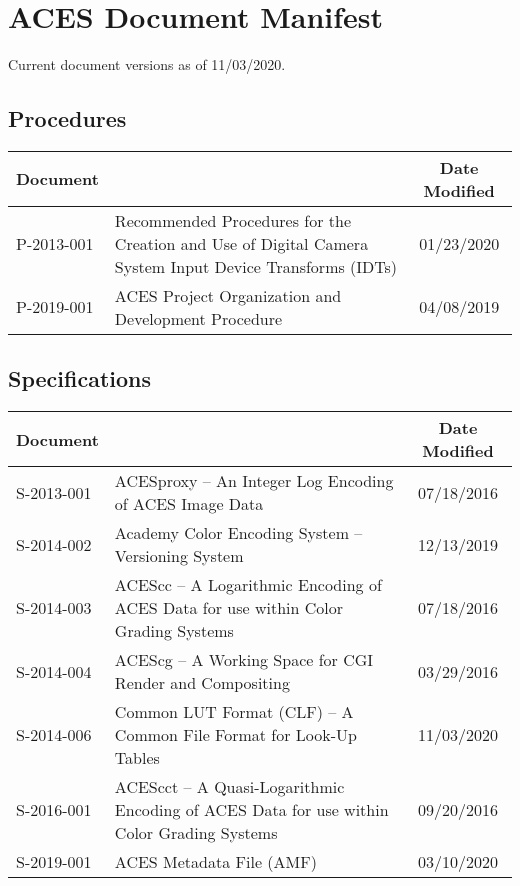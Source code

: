 \documentclass[10pt]{academydoc}
\begin{document}
\regularsectionformat

\section*{ACES Document Manifest}
Current document versions as of 11/03/2020.

\subsection*{Procedures}
\begin{tabularx}{\linewidth}{|l X|c|}
\hline
\textbf{Document} & & \textbf{Date Modified} \\ \hline
P-2013-001 & Recommended Procedures for the Creation and Use of Digital Camera System Input Device Transforms (IDTs) & 01/23/2020 \\ \hline
P-2019-001 & ACES Project Organization and Development Procedure & 04/08/2019 \\ \hline
\end{tabularx}

\subsection*{Specifications}
\begin{tabularx}{\linewidth}{|l X|c|}
\hline
\textbf{Document} & & \textbf{Date Modified} \\ \hline
S-2013-001 & ACESproxy -- An Integer Log Encoding of ACES Image Data & 07/18/2016 \\ \hline
S-2014-002 & Academy Color Encoding System -- Versioning System & 12/13/2019 \\ \hline
S-2014-003 & ACEScc -- A Logarithmic Encoding of ACES Data for use within Color Grading Systems & 07/18/2016 \\ \hline
S-2014-004 & ACEScg -- A Working Space for CGI Render and Compositing & 03/29/2016 \\ \hline
S-2014-006 & Common LUT Format (CLF) -- A Common File Format for Look-Up Tables & 11/03/2020 \\ \hline
S-2016-001 & ACEScct -- A Quasi-Logarithmic Encoding of ACES Data for use within Color Grading Systems & 09/20/2016 \\ \hline
S-2019-001 & ACES Metadata File (AMF) & 03/10/2020 \\ \hline
\end{tabularx}
\end{document}
